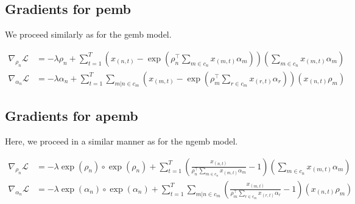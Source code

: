 \documentclass[12pt]{article}
\begin{document}
\subsection{Gradients for \gls{pemb}}
\label{sec:poisson_gradients} 

We proceed similarly as for the \gls{gemb} model.

\begin{align}
\nabla_{\rho_n}\mathcal{L} &=- \lambda \rho_n + \sum_{t=1}^T \left(x_{(n,t)} - \exp\left(\rho_n^{\top} \sum_{m \in c_n} x_{(m,t)}\alpha_{m}\right)\right)\left(\sum_{m \in c_n} x_{(m,t)}\alpha_{m}\right) \\
\nabla_{\alpha_n}\mathcal{L} &=- \lambda \alpha_n + \sum_{t=1}^T \sum_{m |n \in c_m}  \left(x_{(m,t)}-\exp\left( \rho_{m}^{\top} \sum_{r \in c_m} x_{(r,t)}\alpha_{r} \right)\right) \left( x_{(n,t)}\rho_{m}\right)
\end{align}

\subsection{Gradients for \gls{apemb}}
\label{sec:additive_poisson_gradients} 

Here, we proceed in a similar manner as for the \gls{ngemb} model.

\begin{align}
\nabla_{\rho_n}\mathcal{L} &=- \lambda \exp(\rho_n)\circ \exp(\rho_n) + \sum_{t=1}^T \left(\frac{x_{(n,t)}}{\rho_n^{\top} \sum_{m \in c_n} x_{(m,t)}\alpha_{m}} - 1\right)\left(\sum_{m \in c_n} x_{(m,t)}\alpha_{m}\right) \\
\nabla_{\alpha_n}\mathcal{L} &=- \lambda \exp(\alpha_{n})\circ\exp(\alpha_n) + \sum_{t=1}^T \sum_{m |n \in c_m}  \left(\frac{x_{(m,t)}}{\rho_{m}^{\top} \sum_{r \in c_m} x_{(r,t)}\alpha_{r}}-1 \right) \left( x_{(n,t)}\rho_{m}\right)
\end{align}


\newpage
\end{document}
